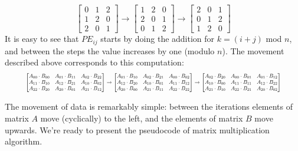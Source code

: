 \documentclass[12pt,a4paper,twoside,openright]{report}
\begin{document}
\begin{equation}
\begin{bmatrix}
0 & 1 & 2 \\
1 & 2 & 0\\
2 & 0 & 1 
\end{bmatrix}
\rightarrow
\begin{bmatrix}
1 & 2 & 0 \\
2 & 0 & 1\\
0 & 1 & 2
\end{bmatrix}
\rightarrow
\begin{bmatrix}
2 & 0 & 1 \\
0 & 1 & 2 \\
1 & 2 & 0
\end{bmatrix}
\end{equation}
It is easy to see that $PE_{ij}$ starts by doing the addition for $k=(i+j)$ mod $n$, and between the steps the value increases by one (modulo $n$). The movement described above corresponds to this computation: 
\begin{equation}
\resizebox{0.9\hsize}{!}{$
\begin{bmatrix}
A_{00} \cdot B_{00} & A_{01} \cdot B_{11} & A_{02} \cdot B_{22} \\
A_{11} \cdot B_{10} & A_{12} \cdot B_{21} & A_{10} \cdot B_{02} \\
A_{22} \cdot B_{20} & A_{20} \cdot B_{01} & A_{21} \cdot B_{12} 
\end{bmatrix}
\rightarrow
\begin{bmatrix}
A_{01} \cdot B_{10} & A_{02} \cdot B_{21} & A_{00} \cdot B_{02} \\
A_{12} \cdot B_{20} & A_{10} \cdot B_{01} & A_{11} \cdot B_{12} \\
A_{20} \cdot B_{00} & A_{21} \cdot B_{11} & A_{22} \cdot B_{22} 
\end{bmatrix}
\rightarrow
\begin{bmatrix}
A_{02} \cdot B_{20} & A_{00} \cdot B_{01} & A_{01} \cdot B_{12} \\
A_{10} \cdot B_{00} & A_{11} \cdot B_{11} & A_{12} \cdot B_{22} \\
A_{21} \cdot B_{10} & A_{22} \cdot B_{21} & A_{20} \cdot B_{02} 
\end{bmatrix}
$}
\end{equation}

The movement of data is remarkably simple: between the iterations elements of matrix $A$ move (cyclically) to the left, and the elements of matrix $B$ move upwards. We're ready to present the pseudocode of matrix multiplication algorithm.
\end{document}
